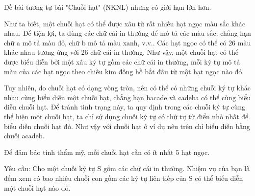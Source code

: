 Đề bài tương tự bài "Chuỗi hạt" (NKNL) nhưng có giới hạn lớn hơn.  

   Như ta biết, một chuỗi hạt có thể được xâu từ rất nhiều hạt ngọc màu sắc khác nhau. Để tiện lợi, ta dùng các chữ cái in thường để mô tả các màu sắc: chẳng hạn chữ a mô tả màu đỏ, chữ b mô tả màu xanh, v.v.. Các hạt ngọc có thể có 26 màu khác nhau tương ứng với 26 chữ cái in thường. Như vậy, một chuỗi hạt có thể được biểu diễn bởi một xâu ký tự gồm các chữ cái in thường, mỗi ký tự mô tả màu của các hạt ngọc theo chiều kim đồng hồ bắt đầu từ một hạt ngọc nào đó.  

   Tuy nhiên, do chuỗi hạt có dạng vòng tròn, nên có thể có những chuỗi ký tự khác nhau cùng biểu diễn một chuỗi hạt, chẳng hạn bacade và cadeba có thể cùng biểu diễn chuỗi hạt. Để tránh tình trạng này, ta quy định trong các chuỗi ký tự cùng thể hiện một chuỗi hạt, ta chỉ sử dụng chuỗi ký tự có thứ tự từ điển nhỏ nhất để biểu diễn chuỗi hạt đó. Như vậy với chuỗi hạt ở ví dụ nêu trên chỉ biểu diễn bằng chuỗi acadeb.  

   Để đảm bảo tính thẩm mỹ, mỗi chuỗi hạt cần có ít nhất 5 hạt ngọc.  

   Yêu cầu: Cho một chuỗi ký tự S gồm các chữ cái in thường. Nhiệm vụ của bạn là đếm xem có bao nhiêu chuỗi con gồm các ký tự liên tiếp của S có thể biểu diễn một chuỗi hạt nào đó.